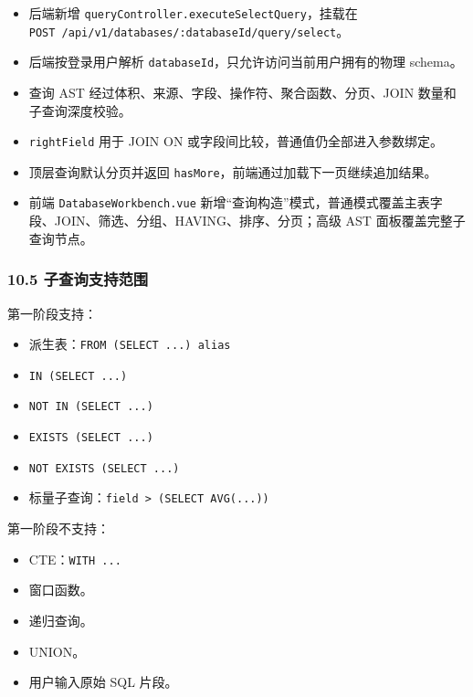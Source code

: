 \documentclass[
  a4paper,
  UTF8]{ctexart}
\providecommand{\tightlist}{%
  \setlength{\itemsep}{0pt}\setlength{\parskip}{0pt}}
\begin{document}
\begin{itemize}
\tightlist
\item
  后端新增 \texttt{queryController.executeSelectQuery}，挂载在
  \texttt{POST\ /api/v1/databases/:databaseId/query/select}。
\item
  后端按登录用户解析 \texttt{databaseId}，只允许访问当前用户拥有的物理
  schema。
\item
  查询 AST 经过体积、来源、字段、操作符、聚合函数、分页、JOIN
  数量和子查询深度校验。
\item
  \texttt{rightField} 用于 JOIN ON
  或字段间比较，普通值仍全部进入参数绑定。
\item
  顶层查询默认分页并返回
  \texttt{hasMore}，前端通过加载下一页继续追加结果。
\item
  前端 \texttt{DatabaseWorkbench.vue}
  新增``查询构造''模式，普通模式覆盖主表字段、JOIN、筛选、分组、HAVING、排序、分页；高级
  AST 面板覆盖完整子查询节点。
\end{itemize}

\hypertarget{ux5b50ux67e5ux8be2ux652fux6301ux8303ux56f4}{%
\subsubsection{10.5
子查询支持范围}\label{ux5b50ux67e5ux8be2ux652fux6301ux8303ux56f4}}

第一阶段支持：

\begin{itemize}
\tightlist
\item
  派生表：\texttt{FROM\ (SELECT\ ...)\ alias}
\item
  \texttt{IN\ (SELECT\ ...)}
\item
  \texttt{NOT\ IN\ (SELECT\ ...)}
\item
  \texttt{EXISTS\ (SELECT\ ...)}
\item
  \texttt{NOT\ EXISTS\ (SELECT\ ...)}
\item
  标量子查询：\texttt{field\ \textgreater{}\ (SELECT\ AVG(...))}
\end{itemize}

第一阶段不支持：

\begin{itemize}
\tightlist
\item
  CTE：\texttt{WITH\ ...}
\item
  窗口函数。
\item
  递归查询。
\item
  UNION。
\item
  用户输入原始 SQL 片段。
\end{itemize}
\end{document}
